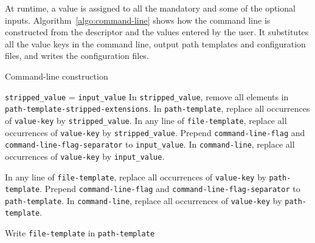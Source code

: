\documentclass{article}
\begin{document}
At runtime, a value is assigned to all the mandatory and some of the
optional inputs. %
Algorithm~\ref{algo:command-line} shows how the command line is
constructed from the descriptor and the values entered by the user. It
substitutes all the value keys in the command line, output path
templates and configuration files, and writes the configuration files.
\begin{algorithm}[h!]
\caption{Command-line construction}
\label{algo:command-line}
\begin{algorithmic}
  \State {}
  \State \texttt{stripped\_value} = \texttt{input\_value}
  \State In \texttt{stripped\_value}, remove  all elements in \texttt{path-template-stripped-extensions}.
  \EndIf
  \State In \texttt{path-template}, replace all occurrences of \texttt{value-key} by \texttt{stripped\_value}.
  \State In any line of \texttt{file-template}, replace all occurrences of \texttt{value-key} by \texttt{stripped\_value}.
  \EndIf
  \EndFor
  \State Prepend \texttt{command-line-flag} and \texttt{command-line-flag-separator} to \texttt{input\_value}.
  \State In \texttt{command-line}, replace all occurrences of \texttt{value-key} by \texttt{input\_value}.
  \EndIf
  \EndFor

  \State {}
  \State In any line of \texttt{file-template}, replace all occurrences of \texttt{value-key} by \texttt{path-template}.
  \State {}
  \EndIf
  \EndFor
  \State Prepend \texttt{command-line-flag} and \texttt{command-line-flag-separator} to \texttt{path-template}.
  \State In \texttt{command-line}, replace all occurrences of \texttt{value-key} by \texttt{path-template}.
  \EndIf
  \EndFor

  \State {}
  \State Write \texttt{file-template} in \texttt{path-template}
  \State {}
  \EndIf
  \EndFor

\end{algorithmic}
\end{algorithm}
\end{document}
